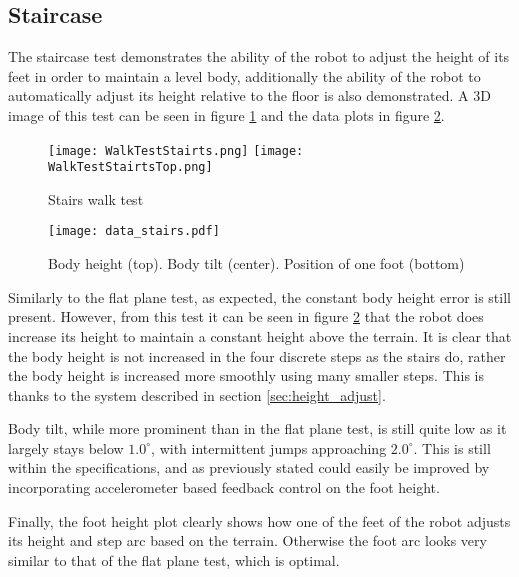     \subsection{Staircase}
    The staircase test demonstrates the ability of the robot to adjust the height of its feet in order to maintain a level body,
    additionally the ability of the robot to automatically adjust its height relative to the floor is also demonstrated. A 3D image
    of this test can be seen in figure \ref{fig:stairs_test} and the data plots in figure \ref{fig:stairs_test_data}.
    \begin{figure}[h]
        \centering
        \texttt{[image: WalkTestStairts.png]}
        \texttt{[image: WalkTestStairtsTop.png]}
        \caption{Stairs walk test}
        \label{fig:stairs_test}
    \end{figure}
    \begin{figure}[h]
        \centering
        \texttt{[image: data\_stairs.pdf]}
        \caption{Body height (top). Body tilt (center). Position of one foot (bottom)}
        \label{fig:stairs_test_data}
    \end{figure}

    Similarly to the flat plane test, as expected, the constant body height error is still present.
    However, from this test it can be seen in figure \ref{fig:stairs_test_data} that the robot does increase its height to maintain a constant
    height above the terrain. It is clear that the body height is not increased in the four discrete steps as the stairs do, rather the
    body height is increased more smoothly using many smaller steps. This is thanks to the system described in section \ref{sec:height_adjust}.

    Body tilt, while more prominent than in the flat plane test, is still quite low as it largely stays below \(1.0^\circ\), with intermittent jumps approaching \(2.0^\circ\).
    This is still within the specifications, and as previously stated could easily be improved by incorporating accelerometer based feedback control on the foot height.

    Finally, the foot height plot clearly shows how one of the feet of the robot adjusts its height and step arc based on the terrain. Otherwise the foot arc looks very similar to that of the
    flat plane test, which is optimal.
    
    \newpage
